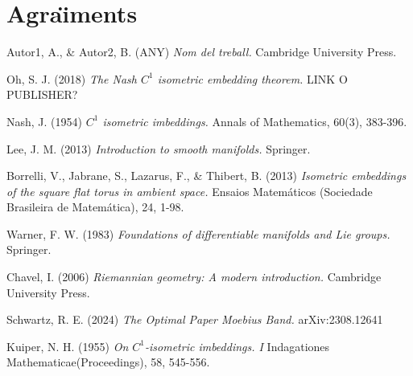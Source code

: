 \documentclass[11pt,a4paper,openright,oneside]{book}
\numberwithin{equation}{section}
\theoremstyle{definition}
\begin{document}
\newpage 


\section*{Agra\"{\i}ments}


\newpage

\tableofcontents

\newpage








%



\normalfont

\newpage
\begin{thebibliography}{25}

{ \color{blue} 
Autor1, A., \& Autor2, B. (ANY)
\newblock \textit{Nom del treball.}
\newblock Cambridge University Press.
}

Oh, S. J. (2018)
\newblock \textit{The Nash $C^1$ isometric embedding theorem.}
\newblock LINK O PUBLISHER?

Nash, J. (1954)
\newblock \textit{$C^1$ isometric imbeddings.}
\newblock Annals of Mathematics, 60(3), 383-396.

Lee, J. M. (2013)
\newblock \textit{Introduction to smooth manifolds.}
\newblock Springer.

Borrelli, V., Jabrane, S., Lazarus, F., \& Thibert, B. (2013)
\newblock \textit{Isometric embeddings of the square flat torus in ambient space.}
\newblock Ensaios Matemáticos (Sociedade Brasileira de Matemática), 24, 1-98.

Warner, F. W. (1983)
\newblock \textit{Foundations of differentiable manifolds and Lie groups.}
\newblock Springer.

Chavel, I. (2006)
\newblock \textit{Riemannian geometry: A modern introduction.}
\newblock Cambridge University Press.

Schwartz, R. E. (2024)
\newblock \textit{The Optimal Paper Moebius Band.}
\newblock arXiv:2308.12641

Kuiper, N. H. (1955)
\newblock \textit{On $C^1$-isometric imbeddings. I}
\newblock Indagationes Mathematicae(Proceedings), 58, 545-556.



\end{thebibliography}
\end{document}
